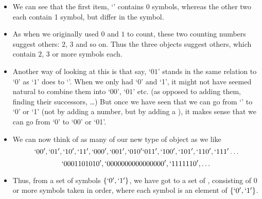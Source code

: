 \begin{itemize}
\item
We can see that the first item, `' contains 0 symbols, whereas the other two each contain 1 symbol, but differ in the symbol.
\item
As when we originally used $0$ and $1$ to count, these two counting numbers suggest others: $2$, $3$ and so on. Thus the three objects suggest others, which contain $2$, $3$ or more symbols each.
\item
Another way of looking at this is that say, `$01$' stands in the same relation to `$0$' as `$1$' does to `'. When we only had `0' and `1', it might not have seemed natural to combine them into `$00$', `$01$' etc. (as opposed to adding them, finding their successors, \ldots) But once we have seen that we can go from `' to `0' or `1' (not by adding a number, but by adding a ), it makes sense that we can go from `0' to `00' or `01'.
\item
We can now think of as many of our new type of object as we like 
\[
`00', `01', `10', `11', `000', `001', `010' `011', `100', `101', `110', `111' \ldots \]
\[ `0001101010', `0000000000000000', `1111110', \ldots \]
\item
Thus, from a set of symbols $\{`0', `1'\}$, we have got to a set of , consisting of $0$ or more symbols taken in order, where each symbol is an element of $\{`0', `1'\}$.

\end{itemize} 

